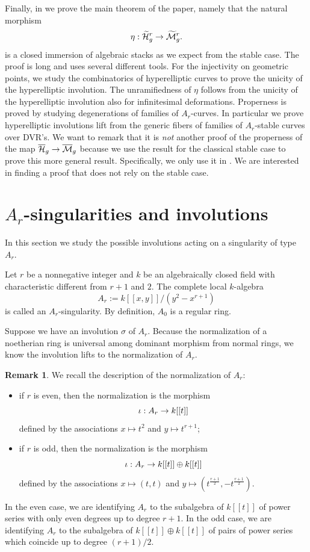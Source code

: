 \documentclass{alggeom}
\numberwithin{equation}{section}
\numberwithin{subsection}{section}
\theoremstyle{definition}
\newtheorem{remark}[theorem]{Remark}
\theoremstyle{remark}
\newcommand\cM{\mathcal{M}} \newcommand\cN{\mathcal{N}}
\newcommand\arr{\ifinner\to\else\longrightarrow\fi}
\newcommand{\Mbar}{\overline{\cM}}
\newcommand{\Mtilde}{\widetilde{\mathcal M}}
\newcommand{\Htilde}{\widetilde{\cH}}
\newcommand{\Hbar}{\overline{\cH}}
\begin{document}
 Finally, in  we prove the main theorem of the paper, namely that the natural morphism $$\eta:\Htilde_g^r \rightarrow \Mtilde_g^r.$$  is a closed immersion of algebraic stacks as we expect from the stable case. The proof is long and uses several different tools.
 For the injectivity on geometric points, we study the combinatorics of hyperelliptic curves to prove the unicity of the hyperelliptic involution. The unramifiedness of $\eta$ follows from the unicity of the hyperelliptic involution also for infinitesimal deformations. Properness is proved by studying degenerations of families of $A_r$-curves. In particular we prove hyperelliptic involutions lift from the generic fibers of families of $A_r$-stable curves over DVR's. We want to remark that it is \emph{not} another proof of the properness of the map $\Hbar_g \rightarrow \Mbar_g$ because we use the result for the classical stable case to prove this more general result. Specifically, we only use it in . We are interested in finding a proof that does not rely on the stable case.


\section{$A_r$-singularities and involutions}\label{sec:1}

In this section we study the possible involutions acting on a singularity of type $A_r$.


Let $r$ be a nonnegative integer and $k$ be an algebraically closed field with characteristic different from $r+1$ and $2$. The complete local $k$-algebra  $$A_r:=k[[x,y]]/(y^2-x^{r+1})$$
is called an $A_r$-singularity. By definition, $A_0$ is a regular ring.		

Suppose we have an involution $\sigma$ of $A_r$. Because the normalization of a noetherian ring is universal among dominant morphism from normal rings, we know the involution lifts to the normalization of $A_r$.

\begin{remark}\label{rem:norm}
	We recall the description of the normalization of $A_r$: 
\begin{itemize}
	\item if $r$ is even, then the normalization is the morphism
	$$ \iota: A_r \arr k[[t]] $$ 
	defined by the associations $x\mapsto t^2$ and $y\mapsto t^{r+1}$;
	 
	\item if $r$ is odd, then the normalization is the morphism 
	$$ \iota: A_r \arr k[[t]]\oplus k[[t]]$$ 
	defined by the associations $x\mapsto (t,t)$ and $y \mapsto (t^{\frac{r+1}{2}}, -t^{\frac{r+1}{2}})$.
\end{itemize}

In the even case, we are identifying $A_r$ to the subalgebra of $k[[t]]$ of power series with only even degrees up to degree $r+1$. In the odd case, we are identifying $A_r$ to the subalgebra of $k[[t]]\oplus k[[t]]$ of pairs of power series which coincide up to degree $(r+1)/2$.
\end{remark}
\end{document}
